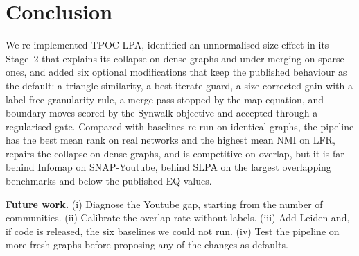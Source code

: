 \documentclass[conference]{IEEEtran}
\begin{document}
\section{Conclusion}
We re-implemented TPOC-LPA, identified an unnormalised size effect in its Stage~2 that explains its collapse on dense graphs and under-merging on sparse ones, and added six optional modifications that keep the published behaviour as the default: a triangle similarity, a best-iterate guard, a size-corrected gain with a label-free granularity rule, a merge pass stopped by the map equation, and boundary moves scored by the Synwalk objective and accepted through a regularised gate. Compared with baselines re-run on identical graphs, the pipeline has the best mean rank on real networks and the highest mean NMI on LFR, repairs the collapse on dense graphs, and is competitive on overlap, but it is far behind Infomap on SNAP-Youtube, behind SLPA on the largest overlapping benchmarks and below the published EQ values.

\textbf{Future work.} (i) Diagnose the Youtube gap, starting from the number of communities. (ii) Calibrate the overlap rate without labels. (iii) Add Leiden and, if code is released, the six baselines we could not run. (iv) Test the pipeline on more fresh graphs before proposing any of the changes as defaults.
\end{document}
